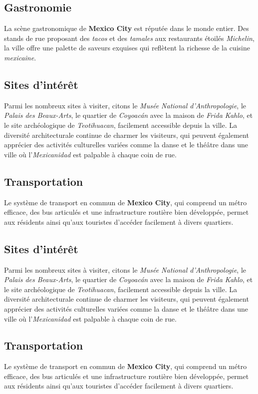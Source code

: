 \documentclass[12pt, a4paper]{article}
\begin{document}
\subsection*{\textbf{Gastronomie}}

La scène gastronomique de \textbf{Mexico City} est réputée dans le monde entier. Des stands de rue proposant des \textit{tacos} et des \textit{tamales} aux restaurants étoilés \textit{Michelin}, la ville offre une palette de saveurs exquises qui reflètent la richesse de la cuisine \textit{mexicaine}.

\subsection*{\textbf{Sites d'intérêt}}

Parmi les nombreux sites à visiter, citons le \textit{Musée National d'Anthropologie}, le \textit{Palais des Beaux-Arts}, le quartier de \textit{Coyoacán} avec la maison de \textit{Frida Kahlo}, et le site archéologique de \textit{Teotihuacan}, facilement accessible depuis la ville.
La diversité architecturale continue de charmer les visiteurs, qui peuvent également apprécier des activités culturelles variées comme la danse et le théâtre dans une ville où l'\textit{Mexicanidad} est palpable à chaque coin de rue. \subsection*{\textbf{Transportation}} Le système de transport en commun de \textbf{Mexico City}, qui comprend un métro efficace, des bus articulés et une infrastructure routière bien développée, permet aux résidents ainsi qu'aux touristes d'accéder facilement à divers quartiers.

\subsection*{\textbf{Sites d'intérêt}}

Parmi les nombreux sites à visiter, citons le \textit{Musée National d'Anthropologie}, le \textit{Palais des Beaux-Arts}, le quartier de \textit{Coyoacán} avec la maison de \textit{Frida Kahlo}, et le site archéologique de \textit{Teotihuacan}, facilement accessible depuis la ville.
La diversité architecturale continue de charmer les visiteurs, qui peuvent également apprécier des activités culturelles variées comme la danse et le théâtre dans une ville où l'\textit{Mexicanidad} est palpable à chaque coin de rue. \subsection*{\textbf{Transportation}} Le système de transport en commun de \textbf{Mexico City}, qui comprend un métro efficace, des bus articulés et une infrastructure routière bien développée, permet aux résidents ainsi qu'aux touristes d'accéder facilement à divers quartiers.
\end{document}
